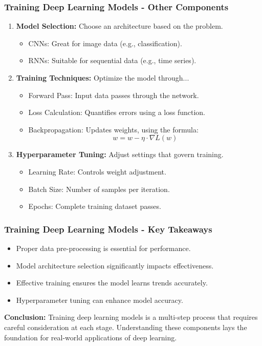 \documentclass{beamer}
\begin{document}
\begin{frame}[fragile]
    \frametitle{Training Deep Learning Models - Other Components}
    \begin{enumerate}
        \item \textbf{Model Selection:} Choose an architecture based on the problem.
        \begin{itemize}
            \item CNNs: Great for image data (e.g., classification).
            \item RNNs: Suitable for sequential data (e.g., time series).
        \end{itemize}

        \item \textbf{Training Techniques:} Optimize the model through...
        \begin{itemize}
            \item Forward Pass: Input data passes through the network.
            \item Loss Calculation: Quantifies errors using a loss function.
            \item Backpropagation: Updates weights, using the formula:
            \[
              w = w - \eta \cdot \nabla L(w)
            \]
        \end{itemize}
        
        \item \textbf{Hyperparameter Tuning:} Adjust settings that govern training.
        \begin{itemize}
            \item Learning Rate: Controls weight adjustment.
            \item Batch Size: Number of samples per iteration.
            \item Epochs: Complete training dataset passes.
        \end{itemize}
    \end{enumerate}
\end{frame}

\begin{frame}[fragile]
    \frametitle{Training Deep Learning Models - Key Takeaways}
    \begin{itemize}
        \item Proper data pre-processing is essential for performance.
        \item Model architecture selection significantly impacts effectiveness.
        \item Effective training ensures the model learns trends accurately.
        \item Hyperparameter tuning can enhance model accuracy.
    \end{itemize}
    
    \textbf{Conclusion:} Training deep learning models is a multi-step process that requires careful consideration at each stage. Understanding these components lays the foundation for real-world applications of deep learning.
\end{frame}
\end{document}
